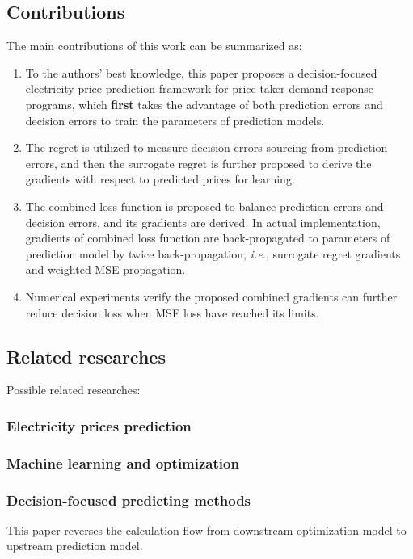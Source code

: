 \documentclass[journal]{IEEEtran}
\begin{document}
\subsection{Contributions}
The main contributions of this work can be summarized as:
\begin{enumerate}
  \item To the authors' best knowledge, this paper proposes a decision-focused electricity price prediction framework for price-taker demand response programs, which \textbf{first} takes the advantage of both prediction errors and decision errors to train the parameters of prediction models.
  \item The regret is utilized to measure decision errors sourcing from prediction errors, and then the surrogate regret is further proposed to derive the gradients with respect to predicted prices for learning.
  \item The combined loss function is proposed to balance prediction errors and decision errors, and its gradients are derived. In actual implementation, gradients of combined loss function are back-propagated to parameters of prediction model by twice back-propagation, \textit{i.e.}, surrogate regret gradients and weighted MSE propagation.
  \item Numerical experiments verify the proposed combined gradients can further reduce decision loss when MSE loss have reached its limits.
\end{enumerate}

\subsection{Related researches}
Possible related researches:

\subsubsection{Electricity prices prediction}

\subsubsection{Machine learning and optimization}

\subsubsection{Decision-focused predicting methods}
This paper reverses the calculation flow from downstream optimization model to upstream prediction model.
\end{document}
